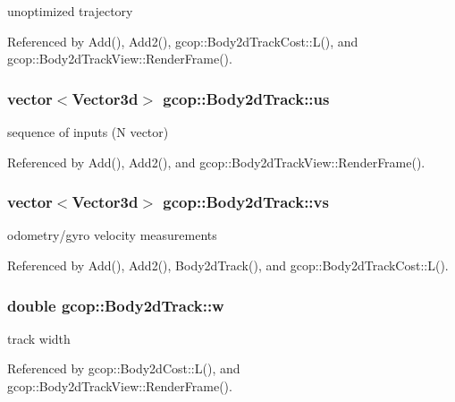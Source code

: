 unoptimized trajectory 



\-Referenced by \-Add(), \-Add2(), gcop\-::\-Body2d\-Track\-Cost\-::\-L(), and gcop\-::\-Body2d\-Track\-View\-::\-Render\-Frame().

\subsubsection[{us}]{\setlength{\rightskip}{0pt plus 5cm}vector$<$\-Vector3d$>$ {\bf gcop\-::\-Body2d\-Track\-::us}}\label{classgcop_1_1Body2dTrack_aea1b855c00a56729b6895287f6d22a35}


sequence of inputs (\-N vector) 



\-Referenced by \-Add(), \-Add2(), and gcop\-::\-Body2d\-Track\-View\-::\-Render\-Frame().

\subsubsection[{vs}]{\setlength{\rightskip}{0pt plus 5cm}vector$<$\-Vector3d$>$ {\bf gcop\-::\-Body2d\-Track\-::vs}}\label{classgcop_1_1Body2dTrack_af0e7d5251579442de064418c5a2ae593}


odometry/gyro velocity measurements 



\-Referenced by \-Add(), \-Add2(), \-Body2d\-Track(), and gcop\-::\-Body2d\-Track\-Cost\-::\-L().

\subsubsection[{w}]{\setlength{\rightskip}{0pt plus 5cm}double {\bf gcop\-::\-Body2d\-Track\-::w}}\label{classgcop_1_1Body2dTrack_a4dc202c7ad3ee5e459230bd809966b69}


track width 



\-Referenced by gcop\-::\-Body2d\-Cost\-::\-L(), and gcop\-::\-Body2d\-Track\-View\-::\-Render\-Frame().

